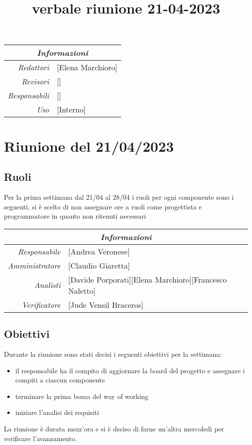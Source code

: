 \documentclass[12pt]{article}
\begin{document}
\graphicspath{ {../templates/img} }

\title{verbale riunione 21-04-2023}

\firstPage
\maketitle

\begin{center}
\begin{tabular}{r | l}
    \multicolumn{2}{c}{\textit{Informazioni}}\\
    \hline
    
        \textit{Redattori} &
        [Elena Marchioro]\makecell{}\\
    
        \textit{Revisori} &
        []\makecell{}\\
        \textit{Responsabili} &
        []\makecell{}\\
            \textit{Uso} & 
            [Interno]\makecell{}\\
\end{tabular}
\end{center}


\tableofcontents
\printindex 
\section{Riunione del 21/04/2023}
\subsection{Ruoli}
Per la prima settimana dal 21/04 al 28/04 i ruoli per ogni componente sono i seguenti, si è scelto di non assegnare ore a ruoli come progettista e programmatore in quanto non ritenuti necessari
\begin{tabular}{r | l}
    \multicolumn{2}{c}{\textit{Informazioni}}\\
    \hline
        \textit{Responsabile} &
        [Andrea Veronese]\makecell{}\\
        \textit{Amministratore} &
        [Claudio Giaretta]\makecell{}\\
        \textit{Analisti} &
        [Davide Porporati][Elena Marchioro][Francesco Naletto]\makecell{}\\
        \textit{Verificatore} & 
        [Jude Vensil Braceros]\makecell{}\\
\end{tabular}
\subsection{Obiettivi}
Durante la riunione sono stati decisi i seguenti obiettivi per la settimana:
\begin{itemize}
    \item il responsabile ha il compito di aggiornare la board del progetto e assegnare i compiti a ciascun componente
    \item terminare la prima bozza del way of working
    \item iniziare l'analisi dei requisiti
\end{itemize}
La riunione è durata mezz'ora e si è deciso di farne un'altra mercoledì per verificare l'avanzamento.
\end{document}
